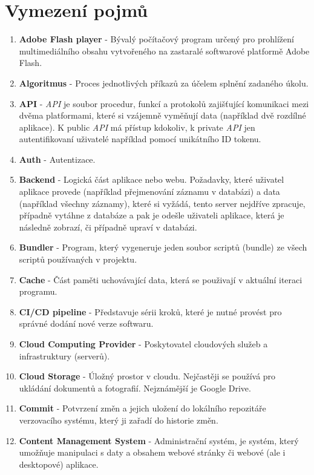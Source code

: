 \documentclass[12pt,a4paper]{report}
\begin{document}
  \chapter{Vymezení pojmů}
  \begin{enumerate}
    \item \textbf{Adobe Flash player} - Bývalý počítačový program určený pro prohlížení multimediálního obsahu vytvořeného na zastaralé softwarové platformě Adobe Flash.
    \item \textbf{Algoritmus} - Proces jednotlivých příkazů za účelem splnění zadaného úkolu.
    \item \textbf{API} - \emph{API} je soubor procedur, funkcí a protokolů zajišťující komunikaci mezi dvěma platformami, které si vzájemně vyměňují data (například dvě rozdílné aplikace). K public \emph{API} má přístup kdokoliv, k private \emph{API} jen autentifikovaní uživatelé například pomocí unikátního ID tokenu.
    \item \textbf{Auth} - Autentizace.
    \item \textbf{Backend} -  Logická část aplikace nebo webu. Požadavky, které uživatel aplikace provede (například přejmenování záznamu v databázi) a data (například všechny záznamy), které si vyžádá, tento server nejdříve zpracuje, případně vytáhne z databáze a pak je odešle uživateli aplikace, která je následně zobrazí, či případně upraví v databázi.
    \item \textbf{Bundler} - Program, který vygeneruje jeden soubor scriptů (bundle) ze všech scriptů používaných v projektu. 
    \item \textbf{Cache} - Část paměti uchovávající data, která se použivají v aktuální iteraci programu.
    \item \textbf{CI/CD pipeline} - Představuje sérii kroků, které je nutné provést pro správné dodání nové verze softwaru.
    \item \textbf{Cloud Computing Provider} - Poskytovatel cloudových služeb a infrastruktury (serverů).
    \item \textbf{Cloud Storage} - Úložný prostor v cloudu. Nejčastěji se používá pro ukládání dokumentů a fotografií. Nejznámější je Google Drive.
    \item \textbf{Commit} - Potvrzení změn a jejich uložení do lokálního repozitáře verzovacího systému, který ji zařadí do historie změn.
    \item \textbf{Content Management System} - Administrační systém, je systém, který umožňuje manipulaci s daty a obsahem webové stránky či webové (ale i desktopové) aplikace.

\end{enumerate}
\end{document}
